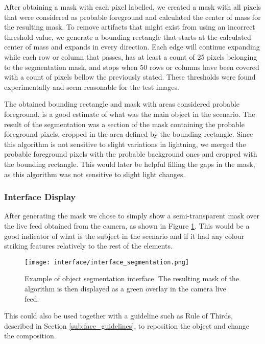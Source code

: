 After obtaining a mask with each pixel labelled, we created a mask with all pixels that were considered as probable foreground and calculated the center of mass for the resulting mask. To remove artifacts that might exist from using an incorrect threshold value, we generate a bounding rectangle that starts at the calculated center of mass and expands in every direction. Each edge will continue expanding while each row or column that passes, has at least a count of 25 pixels belonging to the segmentation mask, and stops when 50 rows or columns have been covered with a count of pixels bellow the previously stated. These thresholds were found experimentally and seem reasonable for the test images.

The obtained bounding rectangle and mask with areas considered probable foreground, is a good estimate of what was the main object in the scenario. The result of the segmentation was a section of the mask containing the probable foreground pixels, cropped in the area defined by the bounding rectangle. Since this algorithm is not sensitive to slight variations in lightning, we merged the probable foreground pixels with the probable background ones and cropped with the bounding rectangle. This would later be helpful filling the gaps in the mask, as this algorithm was not sensitive to slight light changes.

\subsubsection{Interface Display}

After generating the mask we chose to simply show a semi-transparent mask over the live feed obtained from the camera, as shown in Figure \ref{fig:interface_segmentation}. This would be a good indicator of what is the subject in the scenario and if it had any colour striking features relatively to the rest of the elements.

\begin{figure}[htbp]
	\centering
	\texttt{[image: interface/interface\_segmentation.png]}
    \caption{Example of object segmentation interface. The resulting mask of the algorithm is then displayed as a green overlay in the camera live feed.}
  	\label{fig:interface_segmentation}
\end{figure}

This could also be used together with a guideline such as Rule of Thirds, described in Section \ref{sub:face_guidelines}, to reposition the object and change the composition.

